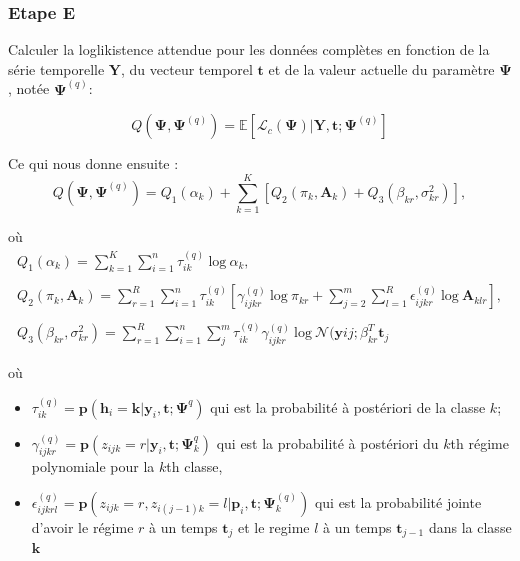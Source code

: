 \documentclass[11pt]{article}
\newcommand{\E}{\mathbb{E}}
\newcommand{\cL}{\mathcal{L}}
\newcommand{\cN}{\mathcal{N}}
\newcommand{\bsy}{\boldsymbol{y}}
\newcommand{\bsp}{\boldsymbol{p}}
\newcommand{\bsk}{\boldsymbol{k}}
\newcommand{\bst}{\boldsymbol{t}}
\newcommand{\bsh}{\boldsymbol{h}}
\newcommand{\ciz}{\textit{z}}
\newcommand{\cil}{\textit{l}}
\newcommand{\cik}{\textit{k}}
\newcommand{\ciQ}{\textit{Q}}
\newcommand{\cir}{\textit{r}}
\newcommand{\sumn}{\sum_{i=1}^{n}}
\newcommand{\sumK}{\sum_{k=1}^{K}}
\newcommand{\sumR}{\sum_{r=1}^{R}}
\newcommand{\bY}{\mathbf{Y}}
\newcommand{\bA}{\mathbf{A}}
\newcommand{\bsPsi}{\boldsymbol{\Psi}}
\begin{document}
\subsubsection{Etape E}

Calculer la loglikistence attendue pour les données complètes en fonction de la série temporelle $\bY$, du vecteur temporel $\bst$ et de la valeur actuelle du paramètre $\bsPsi$ , notée $\bsPsi^{(q)}$: 

\begin{equation}
\ciQ ( \bsPsi , \bsPsi^{(q)}) = \E [ \cL_{c} (\bsPsi) | \bY,\bst ; \bsPsi^{(q)} ]
\end{equation}

Ce qui nous donne ensuite : \\

\begin{equation}
\ciQ ( \bsPsi , \bsPsi^{(q)}) = \ciQ_{1}(\alpha_{k}) + \sumK [ \ciQ_{2}(\pi_{k}, \bA_{k}) + \ciQ_{3}(\beta_{kr}, \sigma_{kr}^{2})],
\end {equation}

où \\

\begin{equation}
\begin{array}{c}
\ciQ_{1}(\alpha_{k}) = \sumK \sumn \tau_{ik}^{(q)} \ \text{log} \ \alpha_{k}, \\
\\
\ciQ_{2}(\pi_{k},\bA_{k}) = \sumR \sumn \tau_{ik}^{(q)} [ \gamma_{ijkr}^{(q)} \ \text{log} \ \pi_{kr} + \sum_{j=2}^{m} \sum_{l=1}^{R} \epsilon_{ijkr}^{(q)} \ \text{log} \ \bA_{klr}],\\
\\
\ciQ_{3}(\beta_{kr},\sigma_{kr}^{2})= \sumR \sumn \sum_{j}^{m} \tau_{ik}^{(q)}  \gamma_{ijkr}^{(q)} \  \text{log} \ \cN (\bsy{ij} ; \beta_{kr}^{T} \bst_{j}
\end{array}
\end{equation}

où \\

\begin{itemize}
\item
$ \tau_{ik}^{(q)} = \bsp(\bsh_{i} = \bsk| \bsy_{i},\bst ; \bsPsi^{q})$ qui est la probabilité à postériori de la classe $\cik$; \\

\item
$\gamma_{ijkr}^{(q)} = \bsp(\ciz_{ijk} = \cir| \bsy_{i},\bst ; \bsPsi_{k}^{q})$ qui est la probabilité à postériori du $\cik$th régime polynomiale pour la $\cik$th classe, \\

\item
$\epsilon_{ijkrl}^{(q)}  = \bsp(\ciz_{ijk} = \cir, \ciz_{i(j-1)k} = \cil | \bsp_{i}, \bst ; \bsPsi_{k}^{(q)})$ qui est la probabilité jointe d'avoir le régime $\cir$ à un temps $\bst_{j}$  et le regime $\cil$ à un temps $\bst_{j-1}$ dans la classe $\bsk$

\end{itemize}
\end{document}
